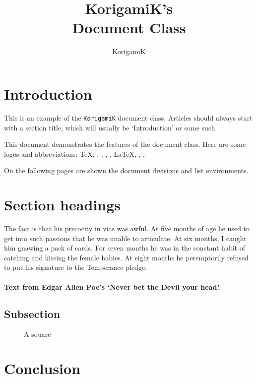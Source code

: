 \documentclass{korigamik}
\title{KorigamiK's\\ Document Class}
\author{KorigamiK}
\begin{document}
\maketitle

\tableofcontents

\section{Introduction}
This is an example of the \texttt{KorigamiK} document class.
Articles should always start with a section title, which will usually be `Introduction' or some such.

This document demonstrates the features of the document class.
Here are some logos and abbreviations:
\TeX, \pdfTeX, \BibTeX, \MF, \MP, \LaTeX, \LaTeXe,
\mbox{\ConTeXt}, \pdfLaTeX

On the following pages are shown the document divisions and list environments.

\section{Section headings}
The fact is that his precocity in vice was awful. At five months of age he
used to get into such passions that he was unable to articulate. At six
months, I caught him gnawing a pack of cards. For seven months he was in
the constant habit of catching and kissing the female babies. At eight
months he peremptorily refused to put his signature to the Temperance
pledge.
\paragraph{Text from Edgar Allen Poe's `Never bet the Devil your head'.}

\subsection{Subsection}
\lipsum[2]

\begin{figure}[htbp]
	\centering
	\square
	\caption{A square}
	\label{fig:square}
\end{figure}

\section{Conclusion}
\lipsum[3]
\end{document}
